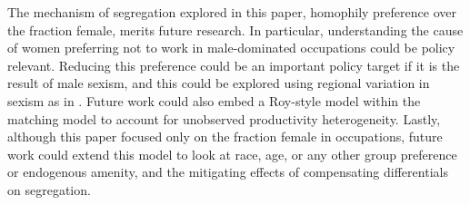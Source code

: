 \documentclass[12pt]{article}
\begin{document}





The mechanism of segregation explored in this paper, homophily preference over the fraction female, merits future research. In particular, understanding the cause of women preferring not to work in male-dominated occupations could be policy relevant. Reducing this preference could be an important policy target if it is the result of male sexism, and this could be explored using regional variation in sexism as in . Future work could also embed a Roy-style model within the matching model to account for unobserved productivity heterogeneity. Lastly, although this paper focused only on the fraction female in occupations, future work could extend this model to look at race, age, or any other group preference or endogenous amenity, and the mitigating effects of compensating differentials on segregation.


	

\end{document}
